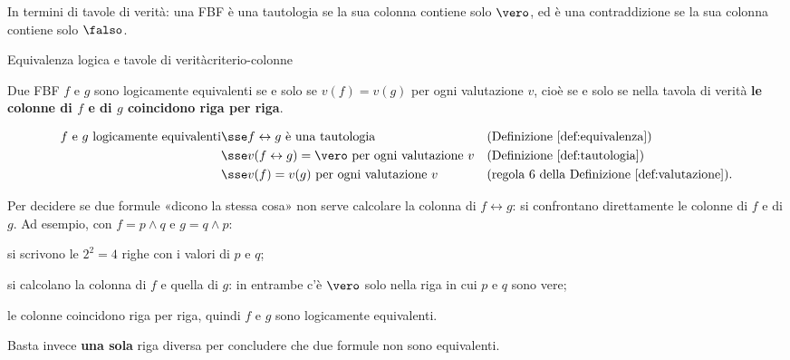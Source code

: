 In termini di tavole di verità: una FBF è una tautologia se la sua colonna contiene solo $\vero$,
ed è una contraddizione se la sua colonna contiene solo $\falso$.


\begin{concetto}
\begin{Proposizione}{Equivalenza logica e tavole di verità}{criterio-colonne}
    \begin{prerequisiti}
    \end{prerequisiti}
    Due FBF $f$ e $g$ sono logicamente equivalenti se e solo se $v(f) = v(g)$ per ogni valutazione $v$,
    cioè se e solo se nella tavola di verità \textbf{le colonne di $f$ e di $g$ coincidono riga per riga}.
\end{Proposizione}

\begin{dimostrazione}
    \[
    \begin{aligned}
        f \text{ e } g \text{ logicamente equivalenti}
        &\sse f \leftrightarrow g \text{ è una tautologia} && \text{(Definizione~\ref{def:equivalenza})}\\
        &\sse v(f \leftrightarrow g) = \vero \text{ per ogni valutazione } v && \text{(Definizione~\ref{def:tautologia})}\\
        &\sse v(f) = v(g) \text{ per ogni valutazione } v && \text{(regola 6 della Definizione~\ref{def:valutazione})}.
    \end{aligned}
    \]
\end{dimostrazione}
\end{concetto}

\begin{spiegazione}
    Per decidere se due formule «dicono la stessa cosa» non serve calcolare la colonna di $f \leftrightarrow g$: si confrontano direttamente le
    colonne di $f$ e di $g$. Ad esempio, con $f = p \wedge q$ e $g = q \wedge p$:
    \begin{passi}
        \item si scrivono le $2^2 = 4$ righe con i valori di $p$ e $q$;
        \item si calcolano la colonna di $f$ e quella di $g$: in entrambe c'è $\vero$ solo nella riga in cui $p$ e $q$ sono vere;
        \item le colonne coincidono riga per riga, quindi $f$ e $g$ sono logicamente equivalenti.
    \end{passi}
    Basta invece \textbf{una sola} riga diversa per concludere che due formule non sono equivalenti.
\end{spiegazione}


